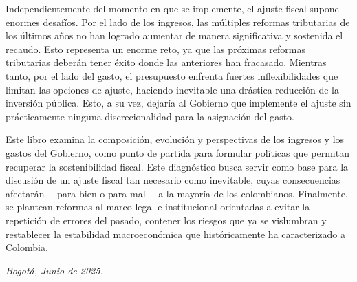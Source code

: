 \begin{preface}
Independientemente del momento en que se implemente, el ajuste fiscal supone enormes desafíos. Por el lado de los ingresos, las múltiples reformas tributarias de los últimos años no han logrado aumentar de manera significativa y sostenida el recaudo. Esto representa un enorme reto, ya que las próximas reformas tributarias deberán tener éxito donde las anteriores han fracasado. Mientras tanto, por el lado del gasto, el presupuesto enfrenta fuertes inflexibilidades que limitan las opciones de ajuste, haciendo inevitable una drástica reducción de la inversión pública. Esto, a su vez, dejaría al Gobierno que implemente el ajuste sin prácticamente ninguna discrecionalidad para la asignación del gasto.

Este libro examina la composición, evolución y perspectivas de los ingresos y los gastos del Gobierno, como punto de partida para formular políticas que permitan recuperar la sostenibilidad fiscal. Este diagnóstico busca servir como base para la discusión de un ajuste fiscal tan necesario como inevitable, cuyas consecuencias afectarán —para bien o para mal— a la mayoría de los colombianos. Finalmente, se plantean reformas al marco legal e institucional orientadas a evitar la repetición de errores del pasado, contener los riesgos que ya se vislumbran y restablecer la estabilidad macroeconómica que históricamente ha caracterizado a Colombia.

\begin{flushright}
\textit{Bogotá, Junio de 2025.}
\end{flushright}

\end{preface}
